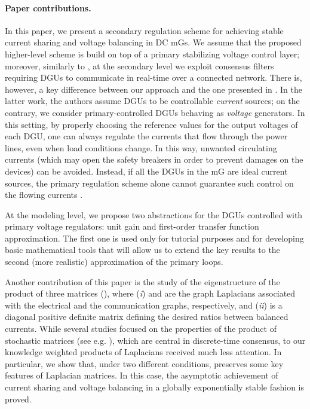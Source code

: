 \documentclass[a4paper]{article}
\theoremstyle{plain}
\begin{document}
\paragraph{Paper contributions.}
In this paper, we present a secondary regulation scheme for achieving stable current sharing and voltage
	balancing in DC mGs. We assume that the proposed higher-level scheme is build on top of a primary stabilizing voltage control layer; moreover, similarly to
	\cite{zhao2015distributed}, at the secondary level we exploit consensus filters requiring DGUs to communicate in real-time over a connected network. 
	There is, however, a key difference between our approach and the one presented in \cite{zhao2015distributed}. In the latter work, the authors assume DGUs to be controllable \textit{current} sources; on the contrary, we consider primary-controlled DGUs behaving as \textit{voltage} generators. In this setting, by properly choosing the reference values for the output voltages of each DGU, one can always regulate the currents that flow through the power lines, even when load conditions change. In this way, unwanted circulating currents (which may open the safety breakers in order to prevent damages on the devices) can be avoided. Instead, if all the DGUs in the mG are ideal current sources, the primary regulation scheme alone cannot guarantee such control on the flowing currents \cite{zhao2015distributed}. 
	
	At the modeling level, we propose two abstractions for the DGUs controlled with primary voltage regulators: unit gain and first-order transfer function approximation. The first one is used only for tutorial purposes and for developing basic mathematical tools that will allow us to extend the key results to the second (more realistic) approximation of the primary loops.
	
	Another contribution of this paper is the study of the eigenstructure of the product of three matrices (), where (\textit{i})  and  are the graph Laplacians associated with the electrical
	and the communication graphs, respectively, and (\textit{ii})  is a diagonal positive definite matrix defining the desired ratios between balanced currents. While several studies focused on the properties of the product of stochastic
	matrices (see e.g. \cite{jadbabaie2003coordination}), which are
	central in discrete-time consensus, to our knowledge weighted products of
	Laplacians received much less attention. In particular, we show that, under two different conditions,  preserves some key features of Laplacian matrices. In this case, the asymptotic achievement of current sharing and voltage balancing in a globally exponentially stable fashion is proved.
	
\end{document}
